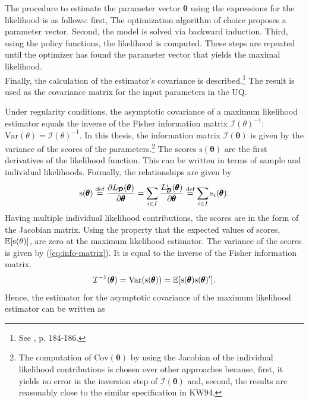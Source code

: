 The procedure to estimate the parameter vector $\pmb{\theta}$ using the expressions for the likelihood is as follows: first, The optimization algorithm of choice proposes a parameter vector. Second, the model is solved via backward induction. Third, using the policy functions, the likelihood is computed. These steps are repeated until the optimizer has found the parameter vector that yields the maximal likelihood.\\
\newline
Finally, the calculation of the estimator's covariance is described.\footnote{See \cite{Verbeek.2012}, p. 184-186.} The result is used as the covariance matrix for the input parameters in the UQ.

Under regularity conditions, the asymptotic covariance of a maximum likelihood estimator equals the inverse of the Fisher information matrix $\mathcal{I}(\theta)^{-1}$: $\text{Var}(\theta)=\mathcal{I}(\theta)^{-1}$. In this thesis, the information matrix $\mathcal{I}(\pmb{\theta})$ is given by the variance of the scores of the parameters.\footnote{The computation of $\text{Cov}(\pmb{\theta})$ by using the Jacobian of the individual likelihood contributions is chosen over other approaches because, first, it yields no error in the inversion step of $\mathcal{I}(\pmb{\theta})$ and, second, the results are reasonably close to the similar specification in KW94.} The scores $\text{s}(\pmb{\theta})$ are the first derivatives of the likelihood function. This can be written in terms of sample and individual likelihoods. Formally, the relationships are given by
\begin{align} \label{eq:scores}
\text{s}(\pmb{\theta}) \stackrel{\text{def}}{=} \frac{\partial L_{\pmb{\mathcal{D}}}({\pmb{\theta}})} {\partial \pmb{\theta}} = \sum_{i \in I} \frac{L_{\pmb{\mathcal{D}}}^{i}(\pmb{\theta})}{\partial \pmb{\theta}} \stackrel{\text{def}}{=} \sum_{i \in I}\text{s}_i(\pmb{\theta}).
\end{align}
Having multiple individual likelihood contributions, the scores are in the form of the  Jacobian matrix.
Using the property that the expected values of scores, $\operatorname*{\mathbb{E}}[\text{s}(\theta)]$, are zero at the maximum likelihood estimator. The variance of the scores is given by (\ref{eq:info-matrix}). It is equal to the inverse of the Fisher information matrix.
\begin{align} \label{eq:info-matrix}
\mathcal{I}^{-1}(\pmb{\theta}) = \text{Var}(\text{s}(\pmb{\theta})) = \operatorname*{\mathbb{E}}[\text{s}(\pmb{\theta})\text{s}(\pmb{\theta})'].
\end{align}
Hence, the estimator for the asymptotic covariance of the maximum likelihood estimator can be written as
